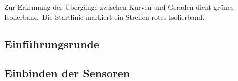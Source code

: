 \documentclass[a4paper,12pt]{article}                                         %
\numberwithin{table}{section}                               %
\numberwithin{figure}{section}                              %
\renewcommand{\thetable}{\arabic{section}.\arabic{table}}   %
\renewcommand{\thefigure}{\arabic{section}.\arabic{figure}} %
\begin{document}
	Zur Erkennung der Übergänge zwischen Kurven und Geraden dient grünes Isolierband. Die Startlinie markiert ein Streifen rotes Isolierband. 
	
	\subsection{Einführungsrunde}
	
	\subsection{Einbinden der Sensoren}
		
	\renewcommand{\thetable}{\Alph{section}.\arabic{table}}              %
	\renewcommand{\thefigure}{\Alph{section}.\arabic{figure}}            %
	\renewcommand{\thelstlisting}{\Alph{section}.\arabic{lstlisting}}    %
	
	\begin{appendix}
	\end{appendix}
	
	
	
	
\end{document}
